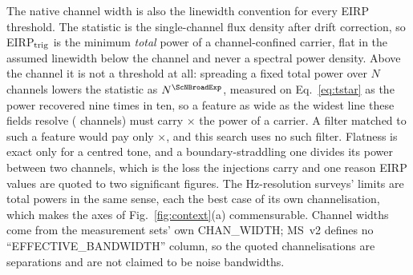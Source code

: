 The native channel width is also the linewidth convention for every EIRP
threshold. The statistic is the single-channel flux density after drift
correction, so EIRP$_{\rm trig}$ is the minimum \emph{total} power of a
channel-confined carrier, flat in the assumed linewidth below the channel and
never a spectral power density. Above the channel it is not a threshold at
all: spreading a fixed total power over $N$ channels lowers the statistic as
$N^{\ScNBroadExp}$, measured on Eq.~\ref{eq:tstar} as the power recovered nine
times in ten, so a feature as wide as the widest line these fields resolve
(\ScNBroadChan{} channels) must carry \ScNBroadRatio$\times$ the power of a
carrier. A filter matched to such a feature would pay only
\ScNBroadRatioMatched$\times$, and this search uses no such filter. Flatness
is exact only for a centred tone, and a boundary-straddling one divides its
power between two channels, which is the loss the injections carry and one
reason EIRP values are quoted to two significant figures. The Hz-resolution
surveys' limits are total powers in the same sense, each the best case of
its own channelisation, which makes the axes of Fig.~\ref{fig:context}(a)
commensurable. Channel widths come from the measurement sets' own
CHAN\_WIDTH; MS~v2 defines no ``EFFECTIVE\_BANDWIDTH'' column, so the quoted
channelisations are separations and are not claimed to be noise bandwidths.

